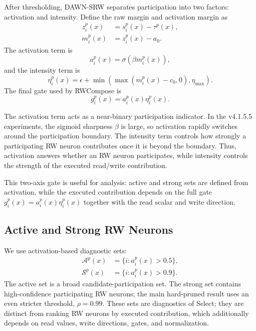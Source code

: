 \documentclass{article}
\begin{document}
After thresholding, DAWN-SRW separates participation into two factors: activation and intensity. Define the raw margin and activation margin as
\begin{align}
    z_i^p(x) &= s_i^p(x)-\tau^p(x), \\
    m_i^p(x) &= z_i^p(x)-a_0 .
\end{align}
The activation term is
\begin{equation}
    a_i^p(x)=\sigma(\beta m_i^p(x)),
\end{equation}
and the intensity term is
\begin{equation}
    \eta_i^p(x)
    = \epsilon + \min\left(\max(m_i^p(x)-c_0,0),\eta_{\max}\right).
\end{equation}
The final gate used by RWCompose is
\begin{equation}
    g_i^p(x)=a_i^p(x)\eta_i^p(x).
\end{equation}

The activation term acts as a near-binary participation indicator. In the v4.1.5.5 experiments, the sigmoid sharpness $\beta$ is large, so activation rapidly switches around the participation boundary. The intensity term controls how strongly a participating RW neuron contributes once it is beyond the boundary. Thus, activation answers whether an RW neuron participates, while intensity controls the strength of the executed read/write contribution.

This two-axis gate is useful for analysis: active and strong sets are defined from activation, while the executed contribution depends on the full gate $g_i^p(x)=a_i^p(x)\eta_i^p(x)$ together with the read scalar and write direction.

\subsection{Active and Strong RW Neurons}

We use activation-based diagnostic sets:
\begin{align}
    \mathcal{A}^p(x) &= \{i:a_i^p(x)>0.5\}, \\
    \mathcal{S}^p(x) &= \{i:a_i^p(x)>0.9\}.
\end{align}
The active set is a broad candidate-participation set. The strong set contains high-confidence participating RW neurons; the main hard-pruned result uses an even stricter threshold, $\rho=0.99$. These sets are diagnostics of Select; they are distinct from ranking RW neurons by executed contribution, which additionally depends on read values, write directions, gates, and normalization.
\end{document}
